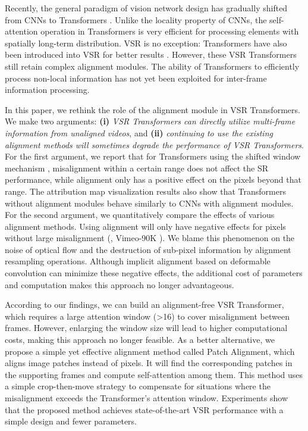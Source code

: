\documentclass{article}
\begin{document}
Recently, the general paradigm of vision network design has gradually shifted from CNNs to Transformers \cite{dosovitskiy2020image,liang2021swinir,chen2021pre}.
Unlike the locality property of CNNs, the self-attention operation in Transformers is very efficient for processing elements with spatially long-term distribution.
VSR is no exception: Transformers have also been introduced into VSR for better results \cite{cao2021video,liang2022vrt,liang2022recurrent}.
However, these VSR Transformers still retain complex alignment modules.
The ability of Transformers to efficiently process non-local information has not yet been exploited for inter-frame information processing.


In this paper, we rethink the role of the alignment module in VSR Transformers.
We make two arguments: \textbf{(i)} \emph{VSR Transformers can directly utilize multi-frame information from unaligned videos}, and \textbf{(ii)} \emph{continuing to use the existing alignment methods will sometimes degrade the performance of VSR Transformers}.
For the first argument, we report that for Transformers using the shifted window mechanism \cite{liu2021swin,liang2021swinir}, misalignment within a certain range does not affect the SR performance, while alignment only has a positive effect on the pixels beyond that range.
The attribution map visualization results \cite{gu2021interpreting} also show that Transformers without alignment modules behave similarly to CNNs with alignment modules.
For the second argument, we quantitatively compare the effects of various alignment methods.
Using alignment will only have negative effects for pixels without large misalignment (\eg, Vimeo-90K \cite{xue2019video}).
We blame this phenomenon on the noise of optical flow and the destruction of sub-pixel information by alignment resampling operations.
Although implicit alignment based on deformable convolution can minimize these negative effects, the additional cost of parameters and computation makes this approach no longer advantageous.


According to our findings, we can build an alignment-free VSR Transformer, which requires a large attention window (>16) to cover misalignment between frames.
However, enlarging the window size will lead to higher computational costs, making this approach no longer feasible.
As a better alternative, we propose a simple yet effective alignment method called Patch Alignment, which aligns image patches instead of pixels.
It will find the corresponding patches in the supporting frames and compute self-attention among them.
This method uses a simple crop-then-move strategy to compensate for situations where the misalignment exceeds the Transformer's attention window.
Experiments show that the proposed method achieves state-of-the-art VSR performance with a simple design and fewer parameters.
\end{document}
